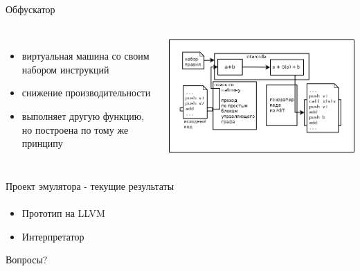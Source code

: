 \documentclass{beamer}              %
\begin{document}
\begin{frame}{Обфускатор}
  \framesubtitle{}
   
  \begin{columns}
      \begin{itemize}
        \item виртуальная машина со своим набором инструкций
        \item снижение производительности
        \item выполняет другую функцию, но построена по тому же принципу
      \end{itemize}
          
        \includegraphics[width=.9\textwidth]{img/RuleApplication.png}
        \footnotemark
  \end{columns}
\end{frame}

\begin{frame}{Проект эмулятора - текущие результаты}
  \framesubtitle{}
  
  \begin{itemize}
      \item Прототип на LLVM
      \item Интерпретатор
  \end{itemize}
  
\end{frame}

%        
%        

\begin{frame}
   Вопросы?
\end{frame}
\end{document}
